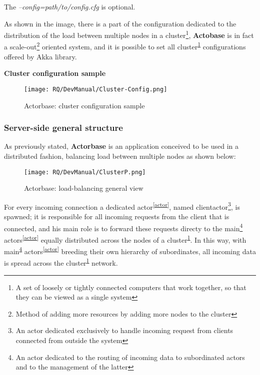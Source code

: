 \documentclass{scalatekids-article}
\begin{document}
The \textit{--config=path/to/config.cfg} is optional.

As shown in the image, there is a part of the configuration dedicated to the
distribution of the load between multiple nodes in a cluster\footnote{A set of
  loosely or tightly connected computers that work together, so that they can be
  viewed as a single system\label{cluster}}, \textbf{Actobase} is in fact a
scale-out\footnote{Method of adding more resources by adding more nodes to the
  cluster\label{cleout}} oriented system, and it is possible to set all
cluster\textsuperscript{\ref{cluster}} configurations offered by Akka library.

\newpage
\textbf{Cluster configuration sample}

\begin{figure}[H]
  \begin{center}
    \texttt{[image: RQ/DevManual/Cluster-Config.png]}
    \caption{Actorbase: cluster configuration sample}
  \end{center}
\end{figure}

\newpage
\subsubsection{Server-side general structure}

As previously stated, \textbf{Actorbase} is an application conceived to be used in a distributed fashion,
balancing load between multiple nodes as shown below:

\begin{figure}[H]
  \begin{center}
    \texttt{[image: RQ/DevManual/ClusterP.png]}
    \caption{Actorbase: load-balancing general view}
  \end{center}
\end{figure}

For every incoming connection a dedicated actor\textsuperscript{\ref{actor}}, named clientactor\footnote{An actor dedicated
  exclusively to handle incoming request from clients connected from outside the
  system}, is spawned; it is responsible for all incoming requests from the
client that is connected, and his main role is to forward these requests directy to the
main\footnote{An actor dedicated to the routing of incoming data to subordinated
  actors and to the management of the latter\label{main}}
actors\textsuperscript{\ref{actor}} equally distributed across the nodes of a
cluster\textsuperscript{\ref{cluster}}. In this way, with
main\textsuperscript{\ref{main}} actors\textsuperscript{\ref{actor}} breeding
their own hierarchy of subordinates, all incoming data is spread across the
cluster\textsuperscript{\ref{cluster}} network.
\end{document}
